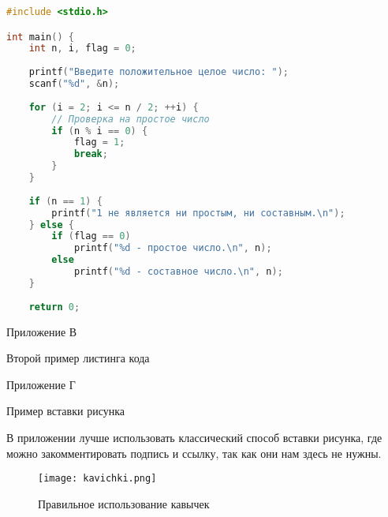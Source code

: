 \documentclass{report}
\begin{document}
\begin{lstlisting}[language=C, frame=single]  
#include <stdio.h>

int main() {
    int n, i, flag = 0;
    
    printf("Введите положительное целое число: ");
    scanf("%d", &n);
    
    for (i = 2; i <= n / 2; ++i) {
        // Проверка на простое число
        if (n % i == 0) {
            flag = 1;
            break;
        }
    }
    
    if (n == 1) {
        printf("1 не является ни простым, ни составным.\n");
    } else {
        if (flag == 0)
            printf("%d - простое число.\n", n);
        else
            printf("%d - составное число.\n", n);
    }
    
    return 0;
\end{lstlisting}
\newpage


\begin{flushright}
     Приложение В
\end{flushright}

\begin{center}  Второй пример листинга кода \end{center}




\newpage


\begin{flushright}
     Приложение Г
\end{flushright}

\begin{center}  Пример вставки рисунка \end{center}

В приложении лучше использовать классический способ вставки рисунка, где можно закомментировать подпись и ссылку, так как они нам здесь не нужны.

\begin{figure}[H]
\centering
    \texttt{[image: kavichki.png]}
    \captionsetup{justification=centering, format=plain}
    \caption{Правильное использование кавычек} %
    \label{fig:pic21}
\end{figure}
\end{document}
